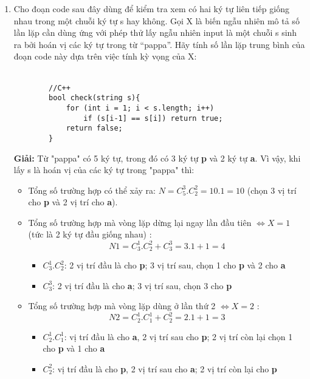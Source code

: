 \documentclass[12pt,a4paper]{article}
\begin{document}
\begin{enumerate}[label=\textbf{Câu 1.\arabic*} ]
    \item Cho đoạn code sau đây dùng để kiểm tra xem có hai ký tự liên tiếp giống nhau
          trong một chuỗi ký tự s hay không. Gọi X là biến ngẫu nhiên mô tả số lần lặp
          cần dùng ứng với phép thử lấy ngẫu nhiên input là một chuỗi s sinh ra bởi hoán
          vị các ký tự trong từ “pappa”. Hãy tính số lần lặp trung bình của đoạn code này
          dựa trên việc tính kỳ vọng của X:\\ \\
          \begin{lstlisting}
        //C++
        bool check(string s){
            for (int i = 1; i < s.length; i++)
                if (s[i-1] == s[i]) return true;
            return false;
        }
    \end{lstlisting}
          \textbf{Giải:} Từ "pappa" có 5 ký tự, trong đó có 3 ký tự \textbf{p} và 2 ký tự \textbf{a}.
          Vì vậy, khi lấy s là hoán vị của các ký tự trong "pappa" thì:
          \begin{itemize}[label=$\bullet$]
              \item  Tổng số trường hợp có thể xảy ra: $N = C^3_5 . C^2_2 = 10.1 = 10$ (chọn 3 vị
                    trí cho \textbf{p} và 2 vị trí cho \textbf{a}).
              \item Tổng số trường hợp mà vòng lặp dừng lại ngay lần đầu tiên $ \Leftrightarrow X =
                        1$ (tức là 2 ký tự đầu giống nhau) : $$N1 = C^1_3.C^2_2 + C^3_3 = 3.1 + 1 = 4$$
                    \begin{itemize}[label=$\circ$]
                        \item $C^1_3.C^2_2$: 2 vị trí đầu là cho \textbf{p}; 3 vị trí sau, chọn 1 cho \textbf{p} và 2 cho \textbf{a}
                        \item $C^3_3$: 2 vị trí đầu là cho \textbf{a}; 3 vị trí sau, chọn 3 cho \textbf{p}
                    \end{itemize}
              \item Tổng số trường hợp mà vòng lặp dùng ở lần thứ 2 $ \Leftrightarrow X = 2$ : $$N2
                        = C^1_2.C^1_1 + C^2_2 = 2.1 + 1 = 3$$
                    \begin{itemize}[label=$\circ$]
                        \item $C^1_2.C^1_1$: vị trí đầu là cho \textbf{a}, 2 vị trí sau cho \textbf{p}; 2 vị trí còn lại chọn 1 cho \textbf{p} và 1 cho \textbf{a}
                        \item $C^2_2$: vị trí đầu là cho \textbf{p}, 2 vị trí sau cho \textbf{a}; 2 vị trí còn lại cho \textbf{p}

\end{itemize}
\end{itemize}
\end{enumerate}
\end{document}
